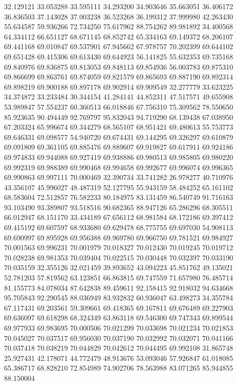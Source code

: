 32.129121
33.053288
33.595111
34.293200
34.903646
35.663051
36.406172
36.836503
37.143028
37.003238
36.523268
36.199312
37.999980
42.263430
55.634587
59.936266
72.734250
75.617962
88.754262
89.981892
34.400568
64.334112
66.651127
68.671145
68.852742
65.334163
69.149372
68.206107
69.441168
69.010847
69.537901
67.945662
67.978757
70.202399
69.644102
69.651428
69.415306
69.613430
69.644923
56.141825
55.632353
69.735168
69.840976
69.836875
69.813053
69.848113
69.854936
56.003783
69.875310
69.866699
69.863761
69.874059
69.821579
69.865693
69.887190
69.892314
69.898219
69.900188
69.897178
69.902914
69.909549
32.277779
33.623225
34.374872
33.233484
30.344154
41.284141
44.852311
47.517571
49.655908
53.989847
57.554237
60.360513
66.018846
67.756310
75.309562
78.550650
85.923635
90.494449
92.769797
95.832043
94.719290
68.139438
67.038950
67.203324
65.996674
69.344279
68.565107
68.951421
69.480613
55.753773
69.646331
69.098577
54.940720
69.674431
69.144295
69.326297
69.610879
69.091809
69.361105
69.885476
69.889607
69.919827
69.617911
69.924186
69.974833
69.944088
69.927419
69.938886
69.980513
69.985805
69.980220
69.992319
69.988389
69.990468
69.994658
69.992677
69.996074
69.996365
69.990863
69.997111
70.000469
32.390734
33.741282
26.978277
40.710976
43.356107
45.996027
48.487319
52.127795
55.943159
58.484252
65.161102
68.583604
72.512857
76.582233
80.184975
83.131459
86.540749
91.716163
93.103490
93.389807
93.518516
90.682365
88.947126
65.286296
68.305511
66.012947
68.151170
33.434189
67.656112
68.981584
68.172186
69.397412
69.415192
69.607597
68.933680
69.629478
68.775755
69.697030
54.908113
69.690997
69.895928
69.956388
69.969780
69.966750
69.781521
69.984927
70.001563
69.996231
70.001979
70.018327
70.012430
70.019245
70.019712
70.028238
69.981353
70.039404
70.022515
70.030448
70.032397
70.033190
70.035159
32.355126
32.021459
39.893652
43.094223
45.851762
49.135021
52.781203
57.819562
63.123851
66.863815
69.747559
71.657980
76.485714
81.155773
84.078034
87.642838
89.459611
92.158415
92.918032
94.634668
95.705843
92.290545
88.036949
83.932832
60.936047
63.498273
34.355784
67.117431
69.203561
59.309661
69.418365
69.167811
69.676489
69.227903
69.636097
69.618298
68.324349
63.863118
69.546300
69.747343
69.899544
69.977933
69.983695
70.000506
70.021299
70.033698
70.021234
70.021853
70.045027
70.037517
69.956030
70.037190
70.032992
70.032071
70.041166
70.037418
70.038219
70.044829
70.042612
70.044495
69.992108
31.865748
25.927431
42.178071
44.772479
48.913676
53.093046
57.926847
61.018085
65.386717
68.828210
72.854989
74.902706
78.563988
83.071265
85.944855
88.150004

